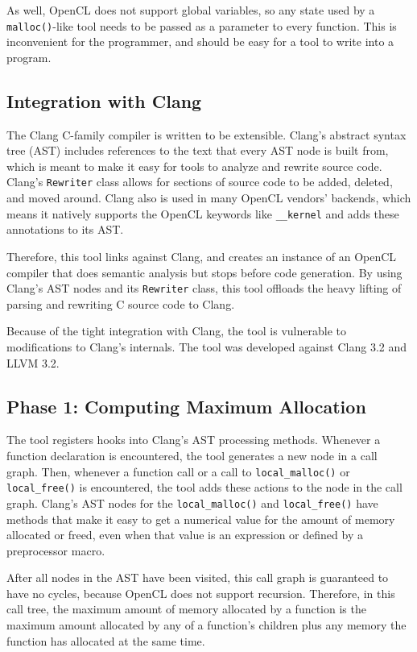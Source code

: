 \documentclass{article}
\begin{document}
As well, OpenCL does not support global variables, so any state used by a \texttt{malloc()}-like tool needs to be passed as a parameter to every function. This is inconvenient for the programmer, and should be easy for a tool to write into a program.

\subsection{Integration with Clang}
The Clang C-family compiler is written to be extensible. Clang's abstract syntax tree (AST) includes references to the text that every AST node is built from, which is meant to make it easy for tools to analyze and rewrite source code. Clang's \texttt{Rewriter} class allows for sections of source code to be added, deleted, and moved around. Clang also is used in many OpenCL vendors' backends, which means it natively supports the OpenCL keywords like \texttt{\_\_kernel} and adds these annotations to its AST.

Therefore, this tool links against Clang, and creates an instance of an OpenCL compiler that does semantic analysis but stops before code generation. By using Clang's AST nodes and its \texttt{Rewriter} class, this tool offloads the heavy lifting of parsing and rewriting C source code to Clang.

Because of the tight integration with Clang, the tool is vulnerable to modifications to Clang's internals. The tool was developed against Clang 3.2 and LLVM 3.2.

\subsection{Phase 1: Computing Maximum Allocation}
The tool registers hooks into Clang's AST processing methods. Whenever a function declaration is encountered, the tool generates a new node in a call graph. Then, whenever a function call or a call to \texttt{local\_malloc()} or \texttt{local\_free()} is encountered, the tool adds these actions to the node in the call graph. Clang's AST nodes for the \texttt{local\_malloc()} and \texttt{local\_free()} have methods that make it easy to get a numerical value for the amount of memory allocated or freed, even when that value is an expression or defined by a preprocessor macro.

After all nodes in the AST have been visited, this call graph is guaranteed to have no cycles, because OpenCL does not support recursion. Therefore, in this call tree, the maximum amount of memory allocated by a function is the maximum amount allocated by any of a function's children plus any memory the function has allocated at the same time.
\end{document}
